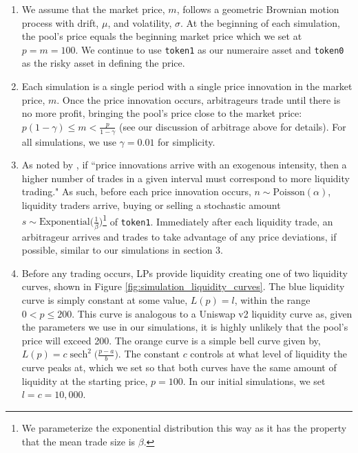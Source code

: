 \documentclass[11pt]{article}
\DeclareMathOperator{\sech}{sech}
\begin{document}
\begin{enumerate}
    \item We assume that the market price, $m$, follows a geometric Brownian motion process with drift, $\mu$, and volatility, $\sigma$. At the beginning of each simulation, the pool's price equals the beginning market price which we set at $p = m = 100$. We continue to use \texttt{token1} as our numeraire asset and \texttt{token0} as the risky asset in defining the price.

    \item Each simulation is a single period with a single price innovation in the market price, $m$. Once the price innovation occurs, arbitrageurs trade until there is no more profit, bringing the pool's price close to the market price: $p (1 - \gamma) \le m < \frac{p}{1 - \gamma}$ (see our discussion of arbitrage above for details). For all simulations, we use $\gamma = 0.01$ for simplicity.

    \item As noted by \citet{Lehar2021DecentralizedE}, if ``price innovations arrive with an exogenous intensity, then a higher number of trades in a given interval must correspond to more liquidity trading." As such, before each price innovation occurs, $n \sim \text{Poisson}(\alpha)$, liquidity traders arrive, buying or selling a stochastic amount $s \sim \text{Exponential} \big( \frac{1}{\beta} \big)$\footnote{We parameterize the exponential distribution this way as it has the property that the mean trade size is $\beta$.} of \texttt{token1}. Immediately after each liquidity trade, an arbitrageur arrives and trades to take advantage of any price deviations, if possible, similar to our simulations in section 3.

    \item Before any trading occurs, LPs provide liquidity creating one of two liquidity curves, shown in Figure \ref{fig:simulation_liquidity_curves}. The blue liquidity curve is simply constant at some value, $L(p) = l$, within the range $0 < p \le 200$. This curve is analogous to a Uniswap v2 liquidity curve as, given the parameters we use in our simulations, it is highly unlikely that the pool's price will exceed 200. The orange curve is a simple bell curve given by, $L(p) = c \sech^2{ \bigl( \frac{p - a}{b} \bigl)}$. The constant $c$ controls at what level of liquidity the curve peaks at, which we set so that both curves have the same amount of liquidity at the starting price, $p = 100$. In our initial simulations, we set $l = c = 10,000$.


\end{enumerate}
\end{document}
